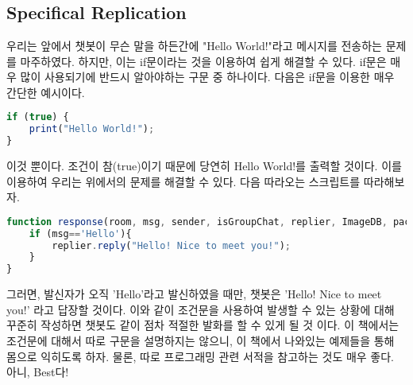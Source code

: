 \documentclass[10pt,b6paper,final]{book}
\begin{document}
\chapter{}
\section{Specifical Replication}
우리는 앞에서 챗봇이 무슨 말을 하든간에 "Hello World!"라고 메시지를 전송하는
문제를 마주하였다. 하지만, 이는 if문이라는 것을 이용하여 쉽게 해결할 수 있다.
if문은 매우 많이 사용되기에 반드시 알아야하는 구문 중 하나이다.
다음은 if문을 이용한 매우 간단한 예시이다.
\begin{lstlisting}[language=JavaScript,escapeinside=~~]
if (true) {
    print("Hello World!");
}
\end{lstlisting}
이것 뿐이다. 조건이 참(true)이기 때문에 당연히 Hello World!를 출력할 것이다.
이를 이용하여 우리는 위에서의 문제를 해결할 수 있다.
다음 따라오는 스크립트를 따라해보자.
\begin{lstlisting}[language=JavaScript,escapeinside=~~]
function response(room, msg, sender, isGroupChat, replier, ImageDB, packageName, threadId){
    if (msg=='Hello'){
        replier.reply("Hello! Nice to meet you!");
    }
}
\end{lstlisting}
그러면, 발신자가 오직 'Hello'라고 발신하였을 때만, 챗봇은 'Hello! Nice to meet you!'
라고 답장할 것이다. 이와 같이 조건문을 사용하여 발생할 수 있는 상황에 대해 꾸준히 작성하면
챗봇도 같이 점차 적절한 발화를 할 수 있게 될 것 이다. 이 책에서는 조건문에 대해서 따로 구문을
설명하지는 않으니, 이 책에서 나와있는 예제들을 통해 몸으로 익히도록 하자. 물론, 따로 프로그래밍
관련 서적을 참고하는 것도 매우 좋다. 아니, Best다!
\end{document}

